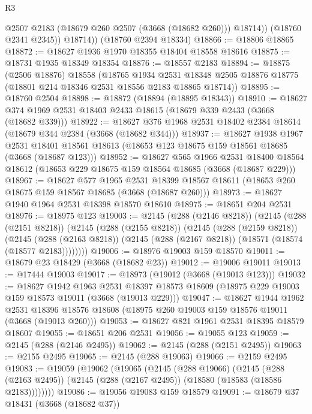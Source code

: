 \begin{lexlean}{R3}
\begin{coremodule}
              @2507
              @2183
              (@18679 @260 @2507 (@3668 (@18682 @260)))
              @18714))
          (@18760 @2341 @2345))
        @18714))
    (@18760 @2394 @18334)
@18866 := @18806 @18865
@18872 := @18627 @1936 @1970 @18355 @18404 @18558 @18616
@18875 := @18731 @1935 @18349 @18354
@18876 := @18557 @2183
@18894 := @18875
    (@2506 @18876)
    @18558
    (@18765
      @1934
      @2531
      @18348
      @2505
      @18876
      @18775
      (@18801 @214 @18346 @2531 @18556 @2183 @18865 @18714))
@18895 := @18760 @2504
@18898 := @18872 (@18894 (@18895 @18343))
@18910 := @18627 @374 @1969 @2531 @18403 @2433 @18615 (@18679 @339 @2433 (@3668 (@18682 @339)))
@18922 := @18627 @376 @1968 @2531 @18402 @2384 @18614 (@18679 @344 @2384 (@3668 (@18682 @344)))
@18937 := @18627
    @1938
    @1967
    @2531
    @18401
    @18561
    @18613
    (@18653 @123 @18675 @159 @18561 @18685 (@3668 (@18687 @123)))
@18952 := @18627
    @565
    @1966
    @2531
    @18400
    @18564
    @18612
    (@18653 @229 @18675 @159 @18564 @18685 (@3668 (@18687 @229)))
@18967 := @18627
    @577
    @1965
    @2531
    @18399
    @18567
    @18611
    (@18653 @260 @18675 @159 @18567 @18685 (@3668 (@18687 @260)))
@18973 := @18627 @1940 @1964 @2531 @18398 @18570 @18610
@18975 := @18651 @204 @2531
@18976 := @18975 @123
@19003 := @2145
    (@288 (@2146 @8218))
    (@2145
      (@288 (@2151 @8218))
      (@2145
        (@288 (@2155 @8218))
        (@2145
          (@288 (@2159 @8218))
          (@2145
            (@288 (@2163 @8218))
            (@2145 (@288 (@2167 @8218)) (@18571 (@18574 (@18577 @2183))))))))
@19006 := @18976 @19003 @159 @18570
@19011 := @18679 @23 @18429 (@3668 (@18682 @23))
@19012 := @19006 @19011
@19013 := @17444 @19003
@19017 := @18973 (@19012 (@3668 (@19013 @123)))
@19032 := @18627
    @1942
    @1963
    @2531
    @18397
    @18573
    @18609
    (@18975 @229 @19003 @159 @18573 @19011 (@3668 (@19013 @229)))
@19047 := @18627
    @1944
    @1962
    @2531
    @18396
    @18576
    @18608
    (@18975 @260 @19003 @159 @18576 @19011 (@3668 (@19013 @260)))
@19053 := @18627 @821 @1961 @2531 @18395 @18579 @18607
@19055 := @18651 @206 @2531
@19056 := @19055 @123
@19059 := @2145 (@288 (@2146 @2495))
@19062 := @2145 (@288 (@2151 @2495))
@19063 := @2155 @2495
@19065 := @2145 (@288 @19063)
@19066 := @2159 @2495
@19083 := @19059
    (@19062
      (@19065
        (@2145
          (@288 @19066)
          (@2145
            (@288 (@2163 @2495))
            (@2145 (@288 (@2167 @2495)) (@18580 (@18583 (@18586 @2183))))))))
@19086 := @19056 @19083 @159 @18579
@19091 := @18679 @37 @18431 (@3668 (@18682 @37))

\end{coremodule}
\end{lexlean}

